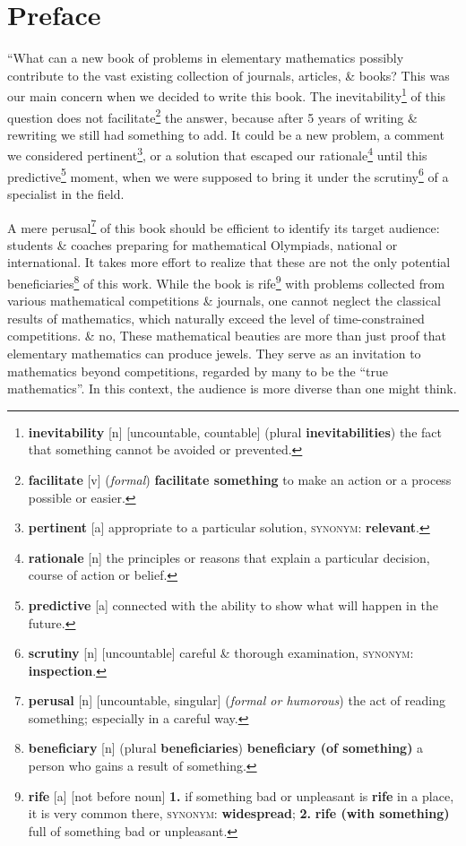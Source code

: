 \documentclass[oneside]{book}
\numberwithin{equation}{section}
\begin{document}
\section*{Preface}
``What can a new book of problems in elementary mathematics possibly contribute to the vast existing collection of journals, articles, \& books? This was our main concern when we decided to write this book. The inevitability\footnote{\textbf{inevitability} [n] [uncountable, countable] (plural \textbf{inevitabilities}) the fact that something cannot be avoided or prevented.} of this question does not facilitate\footnote{\textbf{facilitate} [v] (\textit{formal}) \textbf{facilitate something} to make an action or a process possible or easier.} the answer, because after 5 years of writing \& rewriting we still had something to add. It could be a new problem, a comment we considered pertinent\footnote{\textbf{pertinent} [a] appropriate to a particular solution, \textsc{synonym}: \textbf{relevant}.}, or a solution that escaped our rationale\footnote{\textbf{rationale} [n] the principles or reasons that explain a particular decision, course of action or belief.} until this predictive\footnote{\textbf{predictive} [a] connected with the ability to show what will happen in the future.} moment, when we were supposed to bring it under the scrutiny\footnote{\textbf{scrutiny} [n] [uncountable] careful \& thorough examination, \textsc{synonym}: \textbf{inspection}.} of a specialist in the field.

A mere perusal\footnote{\textbf{perusal} [n] [uncountable, singular] (\textit{formal or humorous}) the act of reading something; especially in a careful way.} of this book should be efficient to identify its target audience: students \& coaches preparing for mathematical Olympiads, national or international. It takes more effort to realize that these are not the only potential beneficiaries\footnote{\textbf{beneficiary} [n] (plural \textbf{beneficiaries}) \textbf{beneficiary (of something)} a person who gains a result of something.} of this work. While the book is rife\footnote{\textbf{rife} [a] [not before noun] \textbf{1.} if something bad or unpleasant is \textbf{rife} in a place, it is very common there, \textsc{synonym}: \textbf{widespread}; \textbf{2.} \textbf{rife (with something)} full of something bad or unpleasant.} with problems collected from various mathematical competitions \& journals, one cannot neglect the classical results of mathematics, which naturally exceed the level of time-constrained competitions. \& no,  These mathematical beauties are more than just proof that elementary mathematics can produce jewels. They serve as an invitation to mathematics beyond competitions, regarded by many to be the ``true mathematics''. In this context, the audience is more diverse than one might think.
\end{document}
